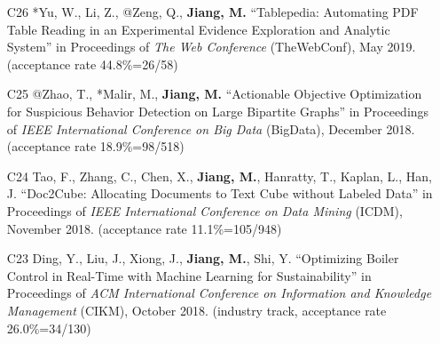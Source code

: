 \documentclass[10pt]{article}
\newenvironment{myindentpar}[1]%
{\begin{list}{}%
         {\setlength{\leftmargin}{#1}}%
         \item[]%
}
{\end{list}}
\newcounter{list}
\newcommand{\hide}[1]{}
\begin{document}
\begin{myindentpar}{0.00cm}
\begin{enumerate}[leftmargin=.5cm]
	\hide{\vspace{-0.1cm}\hspace{0.5cm}{\small \emph{I made 75\% contribution and Ms. Wang made 20\%. I conceived the idea, designed the study, and implemented the system. Ms. Wang did the experiments. Ms. Wang and I wrote the paper.}}}

\item[C26] *Yu, W., Li, Z., @Zeng, Q., \textbf{Jiang, M.} ``Tablepedia: Automating PDF Table Reading in an Experimental Evidence Exploration and Analytic System'' in Proceedings of \emph{The Web Conference} (TheWebConf), May 2019. (acceptance rate 44.8\%=26/58)

	\hide{\vspace{-0.1cm}\hspace{0.5cm}{\small \emph{I made 30\% contribution and Mr. Yu made 60\%. I conceived the idea and designed the study. Mr. Yu (junior) implemented the system and did the experiments. Mr. Yu and I wrote the paper.}}}

\item[C25] @Zhao, T., *Malir, M., \textbf{Jiang, M.} ``Actionable Objective Optimization for Suspicious Behavior Detection on Large Bipartite Graphs'' in Proceedings of \emph{IEEE International Conference on Big Data} (BigData), December 2018. (acceptance rate 18.9\%=98/518)

	\hide{\vspace{-0.1cm}\hspace{0.5cm}{\small \emph{I made 40\% contribution and Mr. Zhao made 40\%. I conceived the idea and designed the study. Mr. Zhao implemented the system. Mr. Malir (sophomore) did the experiments. Mr. Zhao and I wrote the paper.}}}

\item[C24] Tao, F., Zhang, C., Chen, X., \textbf{Jiang, M.}, Hanratty, T., Kaplan, L., Han, J. ``Doc2Cube: Allocating Documents to Text Cube without Labeled Data'' in Proceedings of \emph{IEEE International Conference on Data Mining} (ICDM), November 2018. (acceptance rate 11.1\%=105/948)

	\hide{\vspace{-0.1cm}\hspace{0.5cm}{\small \emph{I made 3\% contribution. Mr. Tao conceived the idea in consultation with myself. Mr. Tao did the experiments and wrote the paper.}}}

\item[C23] Ding, Y., Liu, J., Xiong, J., \textbf{Jiang, M.}, Shi, Y. ``Optimizing Boiler Control in Real-Time with Machine Learning for Sustainability'' in Proceedings of \emph{ACM International Conference on Information and Knowledge Management} (CIKM), October 2018. (industry track, acceptance rate 26.0\%=34/130)


\end{enumerate}
\end{myindentpar}
\end{document}
